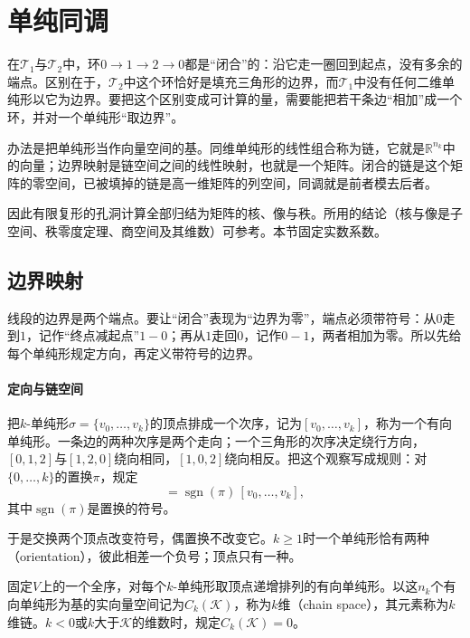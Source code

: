 \section{单纯同调}
\label{sec:homol-simplicial-homology}

在$\mathcal T_1$与$\mathcal T_2$中，环$0\to1\to2\to0$都是“闭合”的：沿它走一圈回到起点，没有多余的端点。区别在于，$\mathcal T_2$中这个环恰好是填充三角形的边界，而$\mathcal T_1$中没有任何二维单纯形以它为边界。要把这个区别变成可计算的量，需要能把若干条边“相加”成一个环，并对一个单纯形“取边界”。

办法是把单纯形当作向量空间的基。同维单纯形的线性组合称为链，它就是$\mathbb R^{n_k}$中的向量；边界映射是链空间之间的线性映射，也就是一个矩阵。闭合的链是这个矩阵的零空间，已被填掉的链是高一维矩阵的列空间，同调就是前者模去后者。

因此有限复形的孔洞计算全部归结为矩阵的核、像与秩。所用的结论（核与像是子空间、秩零度定理、商空间及其维数）可参考。本节固定实数系数。

\subsection{边界映射}
\label{sec:homol-boundary-map}

线段的边界是两个端点。要让“闭合”表现为“边界为零”，端点必须带符号：从$0$走到$1$，记作“终点减起点”$1-0$；再从$1$走回$0$，记作$0-1$，两者相加为零。所以先给每个单纯形规定方向，再定义带符号的边界。

\paragraph{定向与链空间}
把$k$-单纯形$\sigma=\{v_0,\ldots,v_k\}$的顶点排成一个次序，记为$[v_0,\ldots,v_k]$，称为一个有向单纯形。一条边的两种次序是两个走向；一个三角形的次序决定绕行方向，$[0,1,2]$与$[1,2,0]$绕向相同，$[1,0,2]$绕向相反。把这个观察写成规则：对$\{0,\ldots,k\}$的置换$\pi$，规定
\begin{equation}
 [v_{\pi(0)},\ldots,v_{\pi(k)}]=\operatorname{sgn}(\pi)\,[v_0,\ldots,v_k],
 \label{eq:homol-orientation-sign}
\end{equation}
其中$\operatorname{sgn}(\pi)$是置换的符号。

于是交换两个顶点改变符号，偶置换不改变它。$k\geq1$时一个单纯形恰有两种（orientation），彼此相差一个负号；顶点只有一种。

\begin{definition}[链空间]
\label{def:homol-chain-space}
固定$V$上的一个全序，对每个$k$-单纯形取顶点递增排列的有向单纯形。以这$n_k$个有向单纯形为基的实向量空间记为$C_k(\mathcal K)$，称为$k$维（chain space），其元素称为$k$维链。$k<0$或$k$大于$\mathcal K$的维数时，规定$C_k(\mathcal K)=0$。
\end{definition}

